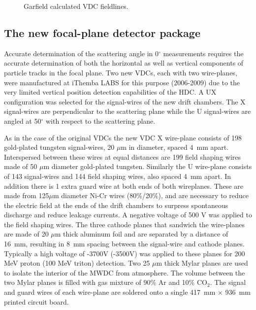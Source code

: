 \documentclass[11pt]{report}
\begin{document}
\begin{figure}
\centerline{\vspace{0cm}\hspace{0cm}
}
\centering
\caption{Garfield calculated VDC fieldlines.}
\label{fig:vdcfieldlines}
\end{figure} 


\subsection{The new focal-plane detector package}

Accurate determination of the scattering angle in 0$^{\circ}$ measurements requires the accurate 
determination of both the horizontal as well as vertical components of particle tracks 
in the focal plane.  
Two new VDCs, each with two wire-planes, were manufactured
at iThemba LABS for this purpose (2006-2009)
due to the very limited vertical position detection capabilities of the HDC.
%
A UX configuration was selected for the signal-wires of the new drift chambers.
The X signal-wires are perpendicular to the scattering plane while the U signal-wires
are angled at 50$^{\circ}$ with respect to the scattering plane.

As in the case of the original VDCs the new VDC X wire-plane 
consists of 198 gold-plated tungsten signal-wires, 20 $\mu $m in diameter,
spaced 4~mm apart. 
Interspersed between these wires at equal distances are 199 field shaping wires 
made of 50 $\mu $m diameter gold-plated tungsten.  Similarly the 
U wire-plane consists of 143 signal-wires and 144 field shaping wires, also spaced 4~mm apart.
%
In addition there is 1 extra guard wire at both ends of both wireplanes. These are made from
125$\mu$m diameter Ni-Cr wires (80\%/20\%), and are necessary to reduce the electric field
at the ends of the drift chambers to surpress spontaneous discharge and reduce leakage currents.
%
A negative voltage of 500 V was applied to the field shaping wires.
The three cathode planes that sandwich the wire-planes are made of 20 $\mu$m thick aluminum foil 
and are separated by a distance of 16~mm, resulting in 8~mm spacing between the signal-wire 
and cathode planes.
Typically a high voltage of -3700V (-3500V) was applied to these planes for 200 MeV proton (100 MeV triton)
detection. 
Two 25 $\mu$m thick Mylar planes are used to isolate the interior 
of the MWDC from atmosphere. The volume between the two Mylar planes is
filled with gas mixture of 90\% Ar and 10\% CO$_{2}$.
%
The signal and guard wires of each wire-plane are soldered 
onto a single 417~mm $\times$ 936~mm printed circuit board. 
\end{document}
